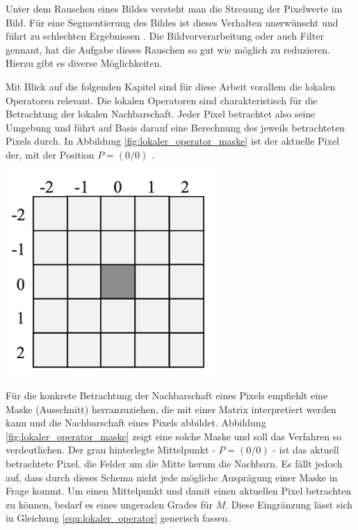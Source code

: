 Unter dem Rauschen eines Bildes versteht man die Streuung der Pixelwerte im Bild.
Für eine Segmentierung des Bildes ist dieses Verhalten unerwünscht und führt zu
schlechten Ergebnissen \citep[vgl.][S.~51]{handels2000}. Die Bildvorverarbeitung
oder auch Filter gennant, hat die Aufgabe dieses Rauschen so gut wie möglich zu reduzieren.
Hierzu gibt es diverse Möglichkeiten.

\begin{minipage}{0.40\textwidth}
	Mit Blick auf die folgenden Kapitel sind für diese Arbeit vorallem die lokalen
	Operatoren relevant. Die lokalen Operatoren sind charakteristisch für die
	Betrachtung der lokalen Nachbarschaft. Jeder Pixel betrachtet also seine Umgebung
	und führt auf Basis darauf eine Berechnung des jeweils betrachteten Pixels durch.
	In Abbildung \ref{fig:lokaler_operator_maske} ist der aktuelle Pixel der, mit der
	Position $P = (0/0)$ \citep[vgl.][S.~52]{handels2000}.
\end{minipage}
\hfill
\begin{minipage}{0.50\textwidth}
	\centering
	\includegraphics[width=0.60\textwidth]{img/lokaler_operator_maske.jpg}
	\label{fig:lokaler_operator_maske}
\end{minipage}

Für die konkrete Betrachtung der Nachbarschaft eines Pixels empfiehlt \citet[S.~52]{handels2000}
eine Maske (Ausschnitt) herranzuziehen, die mit einer Matrix interpretiert werden
kann und die Nachbarschaft eines Pixels abbildet. Abbildung
\ref{fig:lokaler_operator_maske} zeigt eine solche Maske und soll das Verfahren
so verdeutlichen. Der grau hinterlegte Mittelpunkt - $P = (0/0)$ - ist das aktuell
betrachtete Pixel. die Felder um die Mitte herum die Nachbarn. Es fällt jedoch auf,
dass durch dieses Schema nicht jede mögliche Ausprägung einer Maske in Frage
kommt. Um einen Mittelpunkt und damit einen aktuellen Pixel betrachten zu können,
bedarf es eines ungeraden Grades für $M$. Diese Eingränzung lässt sich in Gleichung
\ref{equ:lokaler_operator} generisch fassen.


